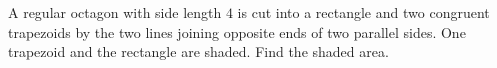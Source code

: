 A regular octagon with side length $4$ is cut into a rectangle and two congruent trapezoids by the two lines joining opposite ends of two parallel sides. One trapezoid and the rectangle are shaded. Find the shaded area.
